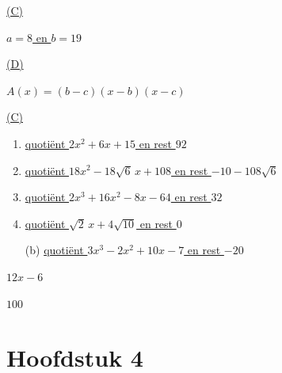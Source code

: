 \documentclass{ximera}
\begin{document}
\begin{Antwoord} \label{antw3.9}
\hyperlink{oef3.9}{(C)}
\end{Antwoord}

\begin{Antwoord} \label{antw3.10}
\hyperlink{oef3.10}{$a = 8$ en $b = 19$}
\end{Antwoord}

\begin{Antwoord} \label{antw3.11}
\hyperlink{oef3.11}{(D)}
\end{Antwoord}

\begin{Antwoord} \label{antw3.12}
\hyperlink{oef3.12}{$A(x) = (b-c)(x-b)(x-c)$}
\end{Antwoord}

\begin{Antwoord} \label{antw3.13}
\hyperlink{oef3.13}{(C)}
\end{Antwoord}

\begin{Antwoord} \label{antw3.14}
\begin{enumerate}
\item
\hyperlink{oef3.14}{quotiënt $2x^2+6x+15$ en rest $92$}
\item
\hyperlink{oef3.14}{quotiënt $18x^2 - 18\sqrt{6}\,x+108$ en rest $-10-108\sqrt{6}$}
\item
\hyperlink{oef3.14}{quotiënt $2x^3+16x^2-8x-64$ en rest $32$}
\item
\hyperlink{oef3.14}{quotiënt $\sqrt{2}\,x+4\sqrt{10}$ en rest $0$}
\end{enumerate}
\end{Antwoord}

\begin{Antwoord} \label{antw3.15}
\begin{enumerate}
\item[(b)]
\hyperlink{oef3.15}{quotiënt $3x^3-2x^2+10x-7$ en rest $-20$}
\end{enumerate}
\end{Antwoord}

\begin{Antwoord} \label{antw3.16}
\hyperlink{oef3.16}{$12x-6$}
\setcounter{enumi}{19}
\end{Antwoord}

\begin{Antwoord} \label{antw3.20}
\hyperlink{oef3.20}{$100$}
\setcounter{enumi}{0}
\end{Antwoord}

\section*{Hoofdstuk 4}
\end{document}
